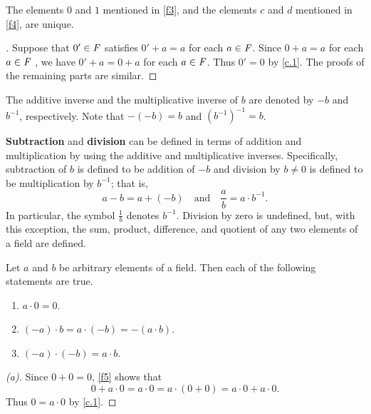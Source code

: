 \begin{cor}\label{c.0.5}
  The elements \(0\) and \(1\) mentioned in \ref{f3}, and the elements \(c\) and \(d\) mentioned in \ref{f4}, are unique.
\end{cor}

\begin{proof}[]
  Suppose that \(0' \in \mathit{F}\) satisfies \(0' + a = a\) for each \(a \in \mathit{F}\).
  Since \(0 + a = a\) for each \(a \in \mathit{F}\) , we have \(0' + a = 0 + a\) for each \(a \in \mathit{F}\).
  Thus \(0' = 0\) by \cref{c.1}.
  The proofs of the remaining parts are similar.
\end{proof}

\begin{defn}\label{c.0.6}
  The additive inverse and the multiplicative inverse of \(b\) are denoted by \(-b\) and \(b^{-1}\), respectively.
  Note that \(-(-b) = b\) and \((b^{-1})^{-1} = b\).
\end{defn}

\begin{defn}\label{c.0.7}
  \textbf{Subtraction} and \textbf{division} can be defined in terms of addition and multiplication by using the additive and multiplicative inverses.
  Specifically, subtraction of \(b\) is defined to be addition of \(-b\) and division by \(b \neq 0\) is defined to be multiplication by \(b^{-1}\);
  that is,
  \[
    a - b = a + (-b) \quad \text{and} \quad \frac{a}{b} = a \cdot b^{-1}.
  \]
  In particular, the symbol \(\frac{1}{b}\) denotes \(b^{-1}\).
  Division by zero is undefined, but, with this exception, the sum, product, difference, and quotient of any two elements of a field are defined.
\end{defn}

\begin{thm}\label{c.2}
  Let \(a\) and \(b\) be arbitrary elements of a field.
  Then each of the following statements are true.
  \begin{enumerate}
    \item \(a \cdot 0 = 0\).
    \item \((-a) \cdot b = a \cdot (-b) = -(a \cdot b)\).
    \item \((-a) \cdot (-b) = a \cdot b\).
  \end{enumerate}
\end{thm}

\begin{proof}[(a)]
  Since \(0 + 0 = 0\), \ref{f5} shows that
  \[
    0 + a \cdot 0 = a \cdot 0 = a \cdot (0 + 0) = a \cdot 0 + a \cdot 0.
  \]
  Thus \(0 = a \cdot 0\) by \cref{c.1}.
\end{proof}

